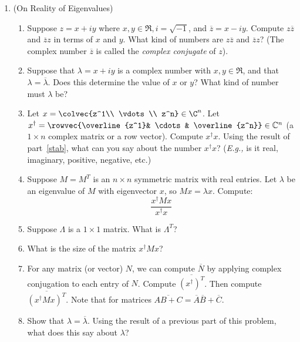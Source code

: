 


\begin{enumerate}
\item\label{prob_real_eigenvalues} (On Reality of Eigenvalues) \begin{enumerate}
\item\label{stab}
Suppose $z=x+iy$ where $x,y \in \Re, i=\sqrt{-1}$, and $\overline{z}=x-iy$. Compute $z\overline{z}$ and $\overline{z}z$ in terms of \(x\) and \(y\). What kind of numbers are \(z \overline{z}\) and \(\overline{z}z\)? (The complex number \(\overline{z}\) is called the \emph{complex conjugate} of \(z\)).

\item Suppose that \(\lambda=x+iy\) is a complex number with \(x,y \in \Re\), and that $\lambda=\overline{\lambda}$. Does this determine the value of \(x\) or \(y\)? What kind of number must \(\lambda\) be?

\item Let $x=\colvec{z^1\\ \vdots \\ z^n}\in \C^n$.  Let $x^\dagger=\rowvec{\overline{z^1}& \cdots & \overline{z^n}} \in \mathbb{C}^n$ (a $1 \times n$ complex matrix or a row vector).  Compute $x^\dagger x$.  Using the result of part~\ref{stab}, what can you say about the number $x^\dagger x$? ({\it E.g.,} is it real, imaginary, positive, negative, etc.)

\item Suppose $M=M^T$ is an $n\times n$ symmetric matrix with real entries.  Let $\lambda$ be an eigenvalue of $M$ with eigenvector $x$, so $Mx=\lambda x$. Compute:
\[
\frac{x^\dagger Mx}{x^\dagger x}
\]

\item Suppose $\Lambda$ is a $1\times 1$ matrix.  What is $\Lambda^T$?

\item What is the size of the matrix $x^\dagger Mx$?

\item For any matrix (or vector) $N$, we can compute $\overline{N}$ by applying complex conjugation to each entry of $N$.
Compute $\overline{(x^\dagger)^T}$.  
Then compute $\overline{(x^\dagger M x)^T}$.
Note that for matrices $\overline{AB + C} = \overline{A} \overline{B} + \overline{C}$.

\item Show that $\lambda=\overline{\lambda}$.  Using the result of a previous part of this problem, what does this say about $\lambda$?
\end{enumerate}


\end{enumerate}
